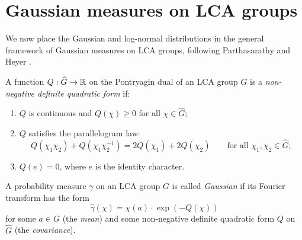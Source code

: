 \section{Gaussian measures on LCA groups}

We now place the Gaussian and log-normal distributions in the general framework of Gaussian measures on LCA groups, following Parthasarathy \cite{Parthasarathy} and Heyer \cite{Heyer}.

\begin{definition}\label{def:quadratic}
A function $Q : \widehat{G} \to \mathbb{R}$ on the Pontryagin dual of an LCA group $G$ is a \emph{non-negative definite quadratic form} if:
\begin{enumerate}[label=(\roman*)]
\item $Q$ is continuous and $Q(\chi) \geq 0$ for all $\chi \in \widehat{G}$;
\item $Q$ satisfies the parallelogram law:
\[
Q(\chi_1 \chi_2) + Q(\chi_1 \chi_2^{-1}) = 2Q(\chi_1) + 2Q(\chi_2) \qquad \text{for all } \chi_1, \chi_2 \in \widehat{G};
\]
\item $Q(e) = 0$, where $e$ is the identity character.
\end{enumerate}
\end{definition}

\begin{definition}\label{def:gaussian-lca}
A probability measure $\gamma$ on an LCA group $G$ is called \emph{Gaussian} if its Fourier transform has the form
\[
\widehat{\gamma}(\chi) = \chi(a) \cdot \exp\!\left(-Q(\chi)\right)
\]
for some $a \in G$ (the \emph{mean}) and some non-negative definite quadratic form $Q$ on $\widehat{G}$ (the \emph{covariance}).
\end{definition}


